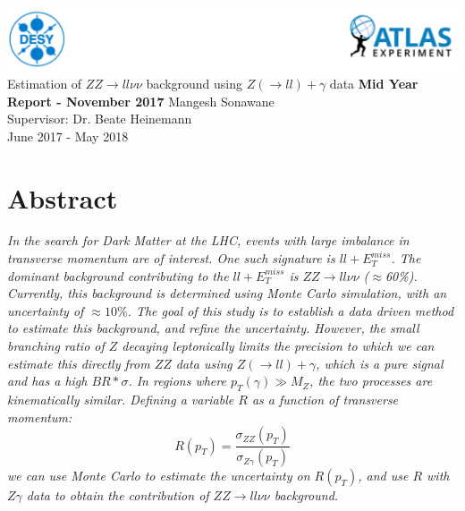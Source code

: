 \documentclass[11pt,a4paper,final]{report}
\begin{document}
\begin{titlepage}
\centering
\vfill
\vfill
\includegraphics[width = \linewidth]{Title_Head.png}
\vspace{1 in}\\
{\huge Estimation of $ZZ \rightarrow ll\nu\nu$ background using $Z(\rightarrow ll)+\gamma$ data}
\vfill
{\LARGE\textbf{Mid Year Report - November 2017}}
\vfill
{\LARGE Mangesh Sonawane\\}
\vspace{0.25cm}
{\LARGE Supervisor: Dr. Beate Heinemann\\}
\vspace{0.5cm}
{\LARGE June 2017 - May 2018}
\vfill
\vfill
\end{titlepage}
\tableofcontents
\newpage
\section*{Abstract}
\textit{
In the search for Dark Matter at the LHC, events with large imbalance in transverse momentum are of interest. One such signature is $ll + E_T^{miss}$. The dominant background contributing to the $ll + E_T^{miss}$ is $ZZ \rightarrow ll\nu\nu$ ($\approx$60\%).  Currently, this background is determined using Monte Carlo simulation, with an uncertainty of $\approx 10\%$. The goal of this study is to establish a data driven method to estimate this background, and refine the uncertainty. However, the small branching ratio of $Z$ decaying leptonically limits the precision to which we can estimate this directly from $ZZ$ data using $Z(\rightarrow ll)+\gamma$, which is a pure signal and has a high $BR*\sigma$. In regions where $p_{T}(\gamma) \gg M_{Z}$, the two processes are kinematically similar.
Defining a variable $R$ as a function of transverse momentum:
\begin{equation*}
	R(p_{T}) = \frac{\sigma_{ZZ}(p_{T})}{\sigma_{Z\gamma}(p_T)}
\end{equation*}
we can use Monte Carlo to estimate the uncertainty on $R(p_T)$, and use $R$ with $Z\gamma$ data to obtain the contribution of $ZZ \rightarrow ll\nu\nu$ background.
}
\end{document}
